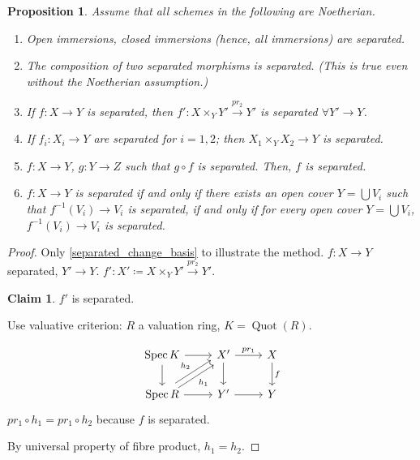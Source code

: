 \documentclass[12pt]{article}
\DeclareMathOperator{\Spec}{Spec}
\DeclareMathOperator{\Quot}{Quot}
\newtheorem*{proposition}{Proposition}
\theoremstyle{definition}
\newtheorem*{claim}{Claim}
\begin{document}
\begin{proposition}
Assume that all schemes in the following are Noetherian.

\begin{enumerate}[label=\arabic*)]
\item Open immersions, closed immersions (hence, all immersions) are separated.

\item The composition of two separated morphisms is separated. (This is true even without the Noetherian assumption.)

\item\label{separated_change_basis} If $f:X\rightarrow Y$ is separated, then $f':X\times_YY'\xrightarrow{pr_2}Y'$ is separated $\forall Y'\rightarrow Y$.

\item If $f_i:X_i\rightarrow Y$ are separated for $i=1,2$; then $X_1\times_YX_2\rightarrow Y$ is separated.

\item $f:X\rightarrow Y$, $g:Y\rightarrow Z$ such that $g\circ f$ is separated. Then, $f$ is separated.

\item $f:X\rightarrow Y$ is separated if and only if there exists an open cover $Y=\bigcup V_i$ such that $f^{-1}(V_i)\rightarrow V_i$ is separated, if and only if for every open cover $Y=\bigcup V_i$, $f^{-1}(V_i)\rightarrow V_i$ is separated.
\end{enumerate}
\end{proposition}

\begin{proof}
Only \ref{separated_change_basis} to illustrate the method. $f:X\rightarrow Y$ separated, $Y'\rightarrow Y$. $f':X'\coloneqq X\times_YY'\xrightarrow{pr_2}Y'$.

\begin{claim}
$f'$ is separated.
\end{claim}

Use valuative criterion: $R$ a valuation ring, $K=\Quot(R)$.

\[
\begin{tikzcd}
\Spec K\arrow[r]\arrow[d]&X'\arrow[r,"pr_1"]\arrow[d]&X\arrow[d,"f"]\\
\Spec R\arrow[r]\arrow[ru,shift left,"h_2"]\arrow[ru,shift right,"h_1",swap]&Y'\arrow[r]&Y
\end{tikzcd}
\]
$pr_1\circ h_1=pr_1\circ h_2$ because $f$ is separated.

By universal property of fibre product, $h_1=h_2$.
\end{proof}
\end{document}
